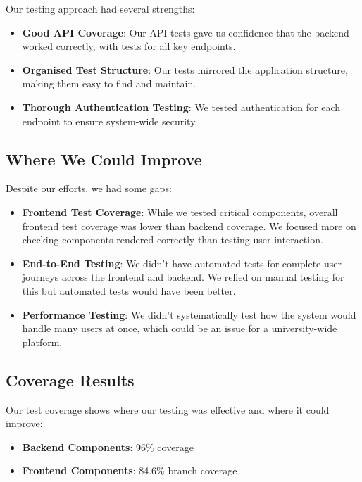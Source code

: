 Our testing approach had several strengths:

\begin{itemize}
    \item \textbf{Good API Coverage}: Our API tests gave us confidence that the backend worked correctly, with tests for all key endpoints.
    
    \item \textbf{Organised Test Structure}: Our tests mirrored the application structure, making them easy to find and maintain.
    
    \item \textbf{Thorough Authentication Testing}: We tested authentication for each endpoint to ensure system-wide security.
\end{itemize}

\subsection{Where We Could Improve}

Despite our efforts, we had some gaps:

\begin{itemize}
    \item \textbf{Frontend Test Coverage}: While we tested critical components, overall frontend test coverage was lower than backend coverage. We focused more on checking components rendered correctly than testing user interaction.
    
    \item \textbf{End-to-End Testing}: We didn't have automated tests for complete user journeys across the frontend and backend. We relied on manual testing for this but automated tests would have been better.
    
    \item \textbf{Performance Testing}: We didn't systematically test how the system would handle many users at once, which could be an issue for a university-wide platform.
\end{itemize}

\subsection{Coverage Results}

Our test coverage shows where our testing was effective and where it could improve:
 
\begin{itemize}
    \item \textbf{Backend Components}: 96\% coverage
    \item \textbf{Frontend Components}: 84.6\% branch coverage
\end{itemize}

